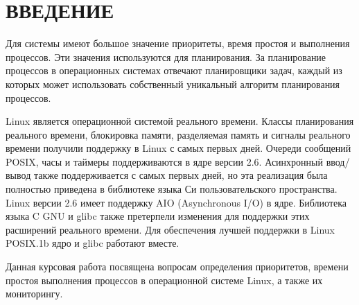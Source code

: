 \section*{ВВЕДЕНИЕ}

Для системы имеют большое значение приоритеты, время простоя и выполнения процессов. Эти значения используются для планирования. За планирование процессов в операционных системах отвечают планировщики задач, каждый из которых может использовать собственный уникальный алгоритм планирования процессов.

Linux является операционной системой реального времени. Классы планирования реального времени, блокировка памяти, разделяемая память и сигналы реального времени получили поддержку в Linux с самых первых дней. Очереди сообщений POSIX, часы и таймеры поддерживаются в ядре версии 2.6. Асинхронный ввод/вывод также поддерживается с самых первых дней, но эта реализация была полностью приведена в библиотеке языка Си пользовательского пространства. Linux версии 2.6 имеет поддержку AIO (Asynchronous I/O) в ядре. Библиотека языка C GNU и glibc также претерпели изменения для поддержки этих расширений реального времени. Для обеспечения лучшей поддержки в Linux POSIX.1b ядро и glibc работают вместе.

Данная курсовая работа посвящена вопросам определения приоритетов, времени простоя выполнения процессов в операционной системе Linux, а также их мониторингу.

\pagebreak